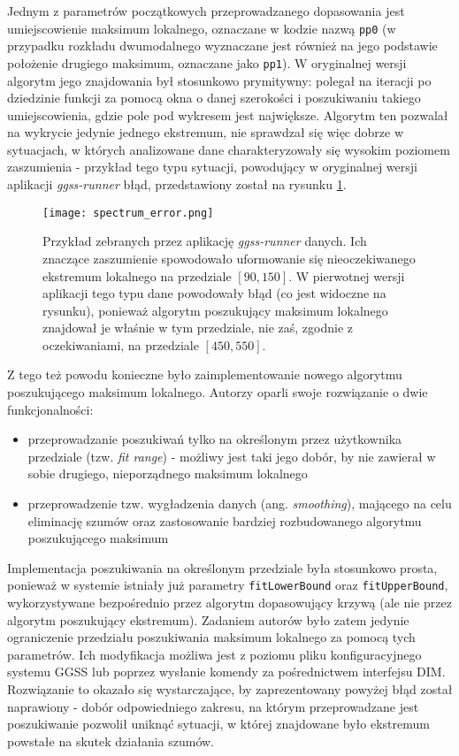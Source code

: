 Jednym z parametrów początkowych przeprowadzanego dopasowania jest umiejscowienie maksimum lokalnego, oznaczane w kodzie nazwą \lstinline{pp0} (w przypadku rozkładu dwumodalnego wyznaczane jest również na jego podstawie położenie drugiego maksimum, oznaczane jako \lstinline{pp1}). W oryginalnej wersji algorytm jego znajdowania był stosunkowo prymitywny: polegał na iteracji po dziedzinie funkcji za pomocą okna o danej szerokości i poszukiwaniu takiego umiejscowienia, gdzie pole pod wykresem jest największe. Algorytm ten pozwalał na wykrycie jedynie jednego ekstremum, nie sprawdzał się więc dobrze w sytuacjach, w których analizowane dane charakteryzowały się wysokim poziomem zaszumienia - przykład tego typu sytuacji, powodujący w oryginalnej wersji aplikacji \emph{ggss-runner} błąd, przedstawiony został na rysunku \ref{fig:spectrum_error}.

\begin{figure}[H]
\centering
\texttt{[image: spectrum\_error.png]}
\caption{Przykład zebranych przez aplikację \emph{ggss-runner} danych. Ich znaczące zaszumienie spowodowało uformowanie się nieoczekiwanego ekstremum lokalnego na przedziale $[90, 150]$. W pierwotnej wersji aplikacji tego typu dane powodowały błąd (co jest widoczne na rysunku), ponieważ algorytm poszukujący maksimum lokalnego znajdował je właśnie w tym przedziale, nie zaś, zgodnie z oczekiwaniami, na przedziale $[450, 550]$.}
\label{fig:spectrum_error}
\end{figure}

Z tego też powodu konieczne było zaimplementowanie nowego algorytmu poszukującego maksimum lokalnego. Autorzy oparli swoje rozwiązanie o dwie funkcjonalności: 
\begin{itemize}
    \item przeprowadzanie poszukiwań tylko na określonym przez użytkownika przedziale (tzw. \emph{fit range}) - możliwy jest taki jego dobór, by nie zawierał w sobie drugiego, nieporządnego maksimum lokalnego
    \item przeprowadzenie tzw. wygładzenia danych (ang. \emph{smoothing}), mającego na celu eliminację szumów oraz zastosowanie bardziej rozbudowanego algorytmu poszukującego maksimum
\end{itemize}

Implementacja poszukiwania na określonym przedziale była stosunkowo prosta, ponieważ w systemie istniały już parametry \lstinline{fitLowerBound} oraz \lstinline{fitUpperBound}, wykorzystywane bezpośrednio przez algorytm dopasowujący krzywą (ale nie przez algorytm poszukujący ekstremum). Zadaniem autorów było zatem jedynie ograniczenie przedziału poszukiwania maksimum lokalnego za pomocą tych parametrów. Ich modyfikacja możliwa jest z poziomu pliku konfiguracyjnego systemu GGSS lub poprzez wysłanie komendy za pośrednictwem interfejsu DIM. Rozwiązanie to okazało się wystarczające, by zaprezentowany powyżej błąd został naprawiony - dobór odpowiedniego zakresu, na którym przeprowadzane jest poszukiwanie pozwolił uniknąć sytuacji, w której znajdowane było ekstremum powstałe na skutek działania szumów. 

